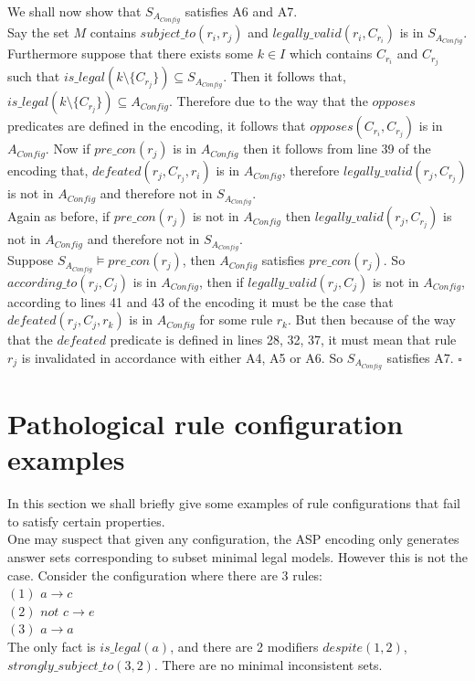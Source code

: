 We shall now show that $S_{A_{Config}}$ satisfies A6 and A7.\\

Say the set $M$ contains $subject\_to(r_{i}, r_{j})$ and $legally\_valid(r_{i}, C_{r_{i}})$ is in $S_{A_{Config}}$. Furthermore suppose that there exists some $k\in I$ which contains $C_{r_{i}}$ and $C_{r_{j}}$ such that $is\_legal(k\setminus \{C_{r_{j}}\})\subseteq S_{A_{Config}}$. Then it follows that, $is\_legal(k\setminus \{C_{r_{j}}\})\subseteq A_{Config}$. Therefore due to the way that the $opposes$ predicates are defined in the encoding, it follows that $opposes(C_{r_{i}}, C_{r_{j}})$ is in $A_{Config}$. Now if $pre\_con(r_{j})$ is in $A_{Config}$ then it follows from line 39 of the encoding that, $defeated(r_{j}, C_{r_{j}}, r_{i}) $ is in $A_{Config}$, therefore $legally\_valid(r_{j}, C_{r_{j}})$ is not in $A_{Config}$ and therefore not in $S_{A_{Config}}$.\\

Again as before, if $pre\_con(r_{j})$ is not in $A_{Config}$ then $legally\_valid(r_{j}, C_{r_{j}})$ is not in $A_{Config}$ and therefore not in $S_{A_{Config}}$.\\

Suppose $S_{A_{Config}}\models pre\_con(r_{j})$, then $A_{Config}$ satisfies $pre\_con(r_{j})$. So $according\_to(r_{j},C_{j})$ is in $A_{Config}$, then if $legally\_valid(r_{j}, C_{j})$ is not in $A_{Config}$, according to lines 41 and 43 of the encoding it must be the case that $defeated(r_{j},C_{j},r_{k})$ is in $A_{Config}$ for some rule $r_{k}$. But then because of the way that the $defeated$ predicate is defined in lines 28, 32, 37, it must mean that rule $r_{j}$ is invalidated in accordance with either A4, A5 or A6. So $S_{A_{Config}}$ satisfies A7. $\square$
\section{Pathological rule configuration examples}
In this section we shall briefly give some examples of rule configurations that fail to satisfy certain properties.\\

One may suspect that given any configuration, the ASP encoding only generates answer sets corresponding to subset minimal legal models. However this is not the case. Consider the configuration where there are 3 rules:\\ $(1)$ $a\rightarrow c$\\
$(2)$ $not$ $c\rightarrow e$\\
$(3)$ $a\rightarrow a$\\
The only fact is $is\_legal(a)$, and there are 2 modifiers $despite(1,2)$, $strongly\_subject\_to(3,2)$. There are no minimal inconsistent sets.\\

